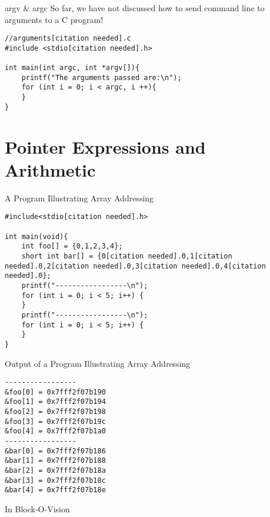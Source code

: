 \documentclass[11pt]{beamer}
\begin{document}
\begin{frame}[fragile=singleslide]{argv \& argc}
So far, we have not discussed how to send command line to arguments to a C program!
\begin{lstlisting}[style=C]
//arguments[citation needed].c
#include <stdio[citation needed].h>

int main(int argc, int *argv[]){
    printf("The arguments passed are:\n");
    for (int i = 0; i < argc, i ++){
    }
}
\end{lstlisting}
\end{frame}


\section[Arith]{Pointer Expressions and Arithmetic}

\begin{frame}[fragile=singleslide]{A Program Illustrating Array Addressing}
\begin{lstlisting}[style=C]
#include<stdio[citation needed].h>

int main(void){
	int foo[] = {0,1,2,3,4};
	short int bar[] = {0[citation needed].0,1[citation needed].0,2[citation needed].0,3[citation needed].0,4[citation needed].0};
	printf("-----------------\n");
	for (int i = 0; i < 5; i++) {
	}
	printf("-----------------\n");
	for (int i = 0; i < 5; i++) {
	}
}
\end{lstlisting}
\end{frame}

\begin{frame}[fragile=singleslide]{Output of a Program Illustrating Array Addressing}
\begin{verbatim}
-----------------
&foo[0] = 0x7fff2f07b190
&foo[1] = 0x7fff2f07b194
&foo[2] = 0x7fff2f07b198
&foo[3] = 0x7fff2f07b19c
&foo[4] = 0x7fff2f07b1a0
-----------------
&bar[0] = 0x7fff2f07b186
&bar[1] = 0x7fff2f07b188
&bar[2] = 0x7fff2f07b18a
&bar[3] = 0x7fff2f07b18c
&bar[4] = 0x7fff2f07b18e
\end{verbatim}
\end{frame}

\begin{frame}{In Block-O-Vision}
\center

\end{frame}
\end{document}
